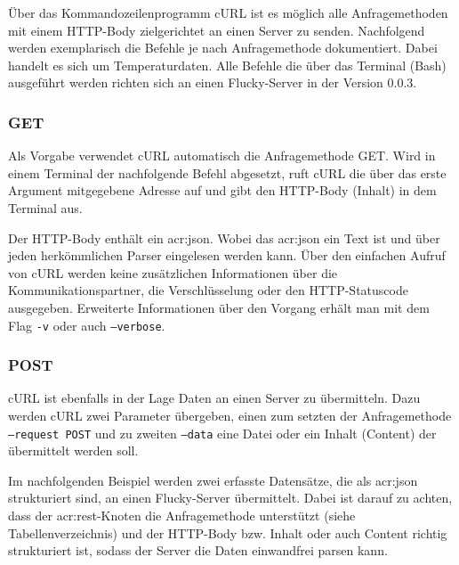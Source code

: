 Über das Kommandozeilenprogramm cURL ist es möglich alle Anfragemethoden mit
einem HTTP-Body zielgerichtet an einen Server zu senden. Nachfolgend werden
exemplarisch die Befehle je nach Anfragemethode dokumentiert. Dabei handelt es
sich um Temperaturdaten. Alle Befehle die über das Terminal (Bash) ausgeführt
werden richten sich an einen Flucky-Server in der Version 0.0.3.

\subsubsection{GET}%
\label{sec:rest.ansteuern.get}

Als Vorgabe verwendet cURL automatisch die Anfragemethode GET. Wird in einem
Terminal der nachfolgende Befehl abgesetzt, ruft cURL die über das erste
Argument mitgegebene Adresse auf und gibt den HTTP-Body (Inhalt) in dem Terminal
aus.


Der HTTP-Body enthält ein \acrshort{acr:json}. Wobei das \acrshort{acr:json} ein
Text ist und über jeden herkömmlichen Parser eingelesen werden kann. Über den
einfachen Aufruf von cURL werden keine zusätzlichen Informationen über die
Kommunikationspartner, die Verschlüsselung oder den HTTP-Statuscode ausgegeben.
Erweiterte Informationen über den Vorgang erhält man mit dem Flag \texttt{-v}
oder auch \texttt{--verbose}.

\subsubsection{POST}%
\label{sec:rest.ansteuern.post}

cURL ist ebenfalls in der Lage Daten an einen Server zu übermitteln. Dazu werden
cURL zwei Parameter übergeben, einen zum setzten der Anfragemethode
\texttt{--request POST} und zu zweiten \texttt{--data} eine Datei oder ein
Inhalt (Content) der übermittelt werden soll.

Im nachfolgenden Beispiel werden zwei erfasste Datensätze, die als
\acrshort{acr:json} strukturiert sind, an einen Flucky-Server übermittelt. Dabei
ist darauf zu achten, dass der \acrshort{acr:rest}-Knoten die Anfragemethode
unterstützt (siehe Tabellenverzeichnis) und der HTTP-Body bzw. Inhalt oder auch
Content richtig strukturiert ist, sodass der Server die Daten einwandfrei parsen
kann.


